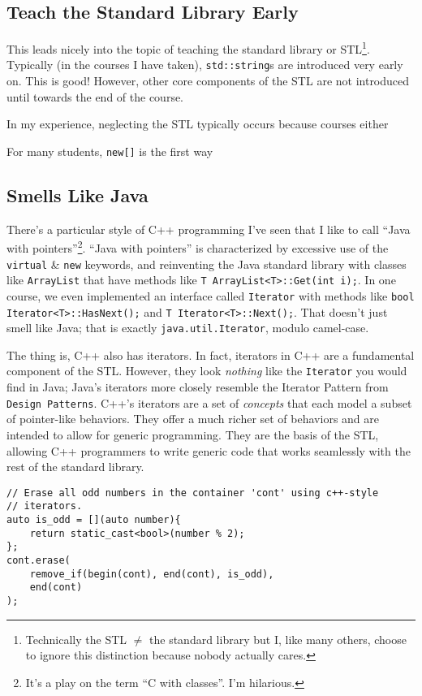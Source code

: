 \documentclass{article}
\newcommand{\CppNewArray}{\lstinline{new[]}}
\begin{document}
\subsection*{Teach the Standard Library Early}

This leads nicely into the topic of teaching the standard library or STL\footnote{Technically the STL $\neq$ the standard library but I, like many others, choose to ignore this distinction because nobody actually cares.}.  Typically (in the courses I have taken), \lstinline{std::string}s are introduced very early on.  This is good!  However, other core components of the STL are not introduced until towards the end of the course.

In my experience, neglecting the STL typically occurs because courses either 

For many students, \CppNewArray{} is the first way 


\subsection*{Smells Like Java}
There's a particular style of C++ programming I've seen that I like to call ``Java with pointers''\footnote{It's a play on the term ``C with classes''.  I'm hilarious.}.  ``Java with pointers'' is characterized by excessive use of the \lstinline{virtual} \& \lstinline{new} keywords, and reinventing the Java standard library with classes like \lstinline{ArrayList} that have methods like \lstinline{T ArrayList<T>::Get(int i);}.  In one course, we even implemented an interface called \lstinline{Iterator} with methods like \lstinline{bool Iterator<T>::HasNext();} and \lstinline{T Iterator<T>::Next();}.  That doesn't just smell like Java; that is exactly \texttt{java.util.Iterator}, modulo camel-case.

The thing is, C++ also has iterators.  In fact, iterators in C++ are a fundamental component of the STL.  However, they look \emph{nothing} like the \lstinline{Iterator} you would find in Java; Java's iterators more closely resemble the Iterator Pattern from \texttt{Design Patterns}.  C++'s iterators are a set of \emph{concepts} that each model a subset of pointer-like behaviors.  They offer a much richer set of behaviors and are intended to allow for generic programming.  They are the basis of the STL, allowing C++ programmers to write generic code that works seamlessly with the rest of the standard library. 

\begin{lstlisting}
// Erase all odd numbers in the container 'cont' using c++-style 
// iterators.
auto is_odd = [](auto number){
	return static_cast<bool>(number % 2);
};
cont.erase(
	remove_if(begin(cont), end(cont), is_odd),
	end(cont)
);
\end{lstlisting}
\end{document}
